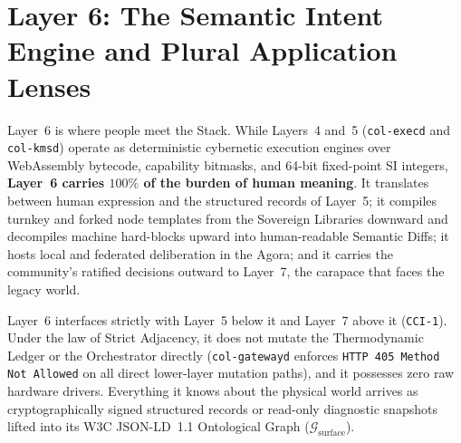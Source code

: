\chapter[Layer 6: The Semantic Engine and Application Lenses]{Layer 6: The Semantic Intent Engine and Plural Application Lenses}

Layer~6 is where people meet the Stack. While Layers~4 and~5 (\texttt{col-execd} and \texttt{col-kmsd}) operate as deterministic cybernetic execution engines over WebAssembly bytecode, capability bitmasks, and 64-bit fixed-point SI integers, \textbf{Layer~6 carries $100\%$ of the burden of human meaning}. It translates between human expression and the structured records of Layer~5; it compiles turnkey and forked node templates from the Sovereign Libraries downward and decompiles machine hard-blocks upward into human-readable Semantic Diffs; it hosts local and federated deliberation in the Agora; and it carries the community's ratified decisions outward to Layer~7, the carapace that faces the legacy world.

Layer~6 interfaces strictly with Layer~5 below it and Layer~7 above it (\texttt{CCI-1}). Under the law of Strict Adjacency, it does not mutate the Thermodynamic Ledger or the Orchestrator directly (\texttt{col-gatewayd} enforces \texttt{HTTP 405 Method Not Allowed} on all direct lower-layer mutation paths), and it possesses zero raw hardware drivers. Everything it knows about the physical world arrives as cryptographically signed structured records or read-only diagnostic snapshots lifted into its W3C JSON-LD~1.1 Ontological Graph ($\mathcal{G}_{\mathrm{surface}}$).

